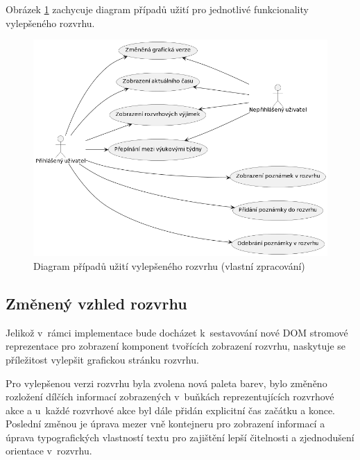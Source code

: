 Obrázek \ref{fig:usecase-rozvrh} zachycuje diagram případů užití pro jednotlivé funkcionality vylepšeného rozvrhu.

\begin{figure}[htbp!]\centering
    \includegraphics[width=\textwidth]{img/uc-rozvrh.png}
    \caption{Diagram případů užití vylepšeného rozvrhu (vlastní zpracování)}
    \label{fig:usecase-rozvrh}
\end{figure}

\subsection{Změnený vzhled rozvrhu}

Jelikož v~rámci implementace bude docházet k~sestavování nové DOM stromové reprezentace pro zobrazení komponent tvořících zobrazení rozvrhu, naskytuje se příležitost vylepšit grafickou stránku rozvrhu. 

Pro vylepšenou verzi rozvrhu byla zvolena nová paleta barev, bylo změněno rozložení dílčích informací zobrazených v~buňkách reprezentujících rozvrhové akce a u~každé rozvrhové akce byl dále přidán explicitní čas začátku a konce. Poslední změnou je úprava mezer vně kontejneru pro zobrazení informací a úprava typografických vlastností textu pro zajištění lepší čitelnosti a zjednodušení orientace v~rozvrhu.

